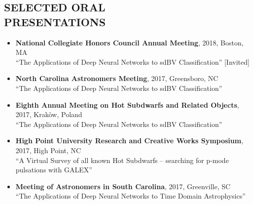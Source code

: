 \documentclass[margin, 10pt]{res} %
\begin{document}
\begin{resume}
\section{SELECTED ORAL\\PRESENTATIONS}
\begin{itemize}
	\item {\scriptsize \textbf{National Collegiate Honors Council Annual Meeting}}, {\small 2018, Boston, MA}\\ ``The Applications of Deep Neural Networks to sdBV Classification'' {\footnotesize [Invited]}
	\item {\scriptsize \textbf{North Carolina Astronomers Meeting}}, {\small 2017, Greensboro, NC}\\ ``The Applications of Deep Neural Networks to sdBV Classification''
	\item {\scriptsize \textbf{Eighth Annual Meeting on Hot Subdwarfs and Related Objects}}, {\small 2017, Krak\`ow, Poland}\\ ``The Applications of Deep Neural Networks to sdBV Classification''
	\item {\scriptsize \textbf{High Point University Research and Creative Works Symposium}}, {\small 2017, High Point, NC}\\ ``A Virtual Survey of all known Hot Subdwarfs -- searching for p-mode pulsations with GALEX''
	\item \textbf{{\scriptsize Meeting of Astronomers in South Carolina}}, {\small 2017, Greenville, SC}\\``The Applications of Deep Neural Networks to Time Domain Astrophysics''
\end{itemize}


\end{resume}
\end{document}
